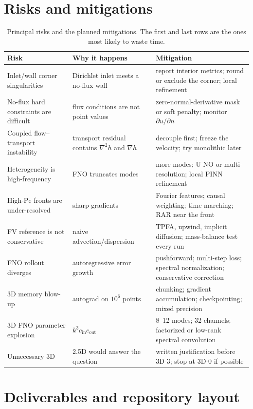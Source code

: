 \documentclass[11pt]{article}
\newcommand{\Pe}{\mathrm{Pe}}
\newcommand{\tabhead}[1]{\textbf{#1}}
\begin{document}
\section{Risks and mitigations}
\label{sec:risks}

\begin{table}[htbp]
\centering
\small
\begin{tabularx}{\textwidth}{@{}YXX@{}}
\toprule
\tabhead{Risk} & \tabhead{Why it happens} & \tabhead{Mitigation}\\
\midrule
Inlet/wall corner singularities & Dirichlet inlet meets a no-flux wall &
report interior metrics; round or exclude the corner; local refinement\\
No-flux hard constraints are difficult & flux conditions are not point values &
zero-normal-derivative mask or soft penalty; monitor $\partial u/\partial n$\\
Coupled flow--transport instability & transport residual contains
$\nabla^2h$ and $\nabla h$ & decouple first; freeze the velocity; try
monolithic later\\
Heterogeneity is high-frequency & FNO truncates modes & more modes; U-NO or
multi-resolution; local PINN refinement\\
High-$\Pe$ fronts are under-resolved & sharp gradients & Fourier features;
causal weighting; time marching; RAR near the front\\
FV reference is not conservative & naive advection/dispersion & TPFA, upwind,
implicit diffusion; mass-balance test every run\\
FNO rollout diverges & autoregressive error growth & pushforward; multi-step
loss; spectral normalization; conservative correction\\
3D memory blow-up & autograd on $10^6$ points & chunking; gradient
accumulation; checkpointing; mixed precision\\
3D FNO parameter explosion & $k^3c_{\mathrm{in}}c_{\mathrm{out}}$ &
8--12 modes; 32 channels; factorized or low-rank spectral convolution\\
Unnecessary 3D & 2.5D would answer the question & written justification before
3D-3; stop at 3D-0 if possible\\
\bottomrule
\end{tabularx}
\caption{Principal risks and the planned mitigations.  The first and last rows
are the ones most likely to waste time.}
\label{tab:risks}
\end{table}

\section{Deliverables and repository layout}
\label{sec:deliverables}
\end{document}
